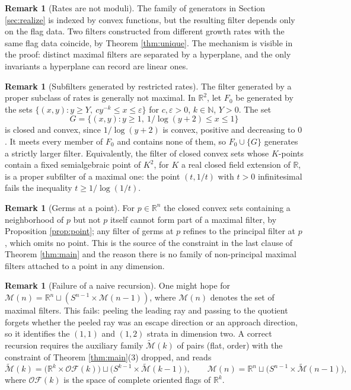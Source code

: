 \documentclass[11pt]{amsart}
\theoremstyle{plain}
\theoremstyle{definition}
\newtheorem{remark}[theorem]{Remark}
\newcommand{\RR}{\mathbb{R}}
\begin{document}
\begin{remark}[Rates are not moduli]\label{rem:rates}
The family of generators in Section \ref{sec:realize} is indexed by convex functions, but the resulting filter depends only on the flag data. Two filters constructed from different growth rates with the same flag data coincide, by Theorem \ref{thm:unique}. The mechanism is visible in the proof: distinct maximal filters are separated by a hyperplane, and the only invariants a hyperplane can record are linear ones.
\end{remark}

\begin{remark}[Subfilters generated by restricted rates]\label{rem:subfilter}
The filter generated by a proper subclass of rates is generally not maximal. In $\RR^2$, let $F_0$ be generated by the sets $\{(x,y):y\ge Y,\ cy^{-k}\le x\le\varepsilon\}$ for $c,\varepsilon>0$, $k\in\mathbb{N}$, $Y>0$. The set
\[
G=\{(x,y):y\ge1,\ 1/\log(y+2)\le x\le1\}
\]
is closed and convex, since $1/\log(y+2)$ is convex, positive and decreasing to $0$. It meets every member of $F_0$ and contains none of them, so $F_0\cup\{G\}$ generates a strictly larger filter. Equivalently, the filter of closed convex sets whose $K$-points contain a fixed semialgebraic point of $K^2$, for $K$ a real closed field extension of $\RR$, is a proper subfilter of a maximal one: the point $(t,1/t)$ with $t>0$ infinitesimal fails the inequality $t\ge1/\log(1/t)$.
\end{remark}

\begin{remark}[Germs at a point]\label{rem:germs}
For $p\in\RR^n$ the closed convex sets containing a neighborhood of $p$ but not $p$ itself cannot form part of a maximal filter, by Proposition \ref{prop:point}; any filter of germs at $p$ refines to the principal filter at $p$, which omits no point. This is the source of the constraint in the last clause of Theorem \ref{thm:main} and the reason there is no family of non-principal maximal filters attached to a point in any dimension.
\end{remark}

\begin{remark}[Failure of a naive recursion]\label{rem:recursion}
One might hope for $\mathcal{M}(n)=\RR^n\sqcup(S^{n-1}\times\mathcal{M}(n-1))$, where $\mathcal{M}(n)$ denotes the set of maximal filters. This fails: peeling the leading ray and passing to the quotient forgets whether the peeled ray was an escape direction or an approach direction, so it identifies the $(1,1)$ and $(1,2)$ strata in dimension two. A correct recursion requires the auxiliary family $\widetilde{\mathcal{M}}(k)$ of pairs (flat, order) with the constraint of Theorem \ref{thm:main}(3) dropped, and reads
\[
\widetilde{\mathcal{M}}(k)=\big(\RR^{k}\times\mathcal{OF}(k)\big)\sqcup\big(S^{k-1}\times\widetilde{\mathcal{M}}(k-1)\big),\qquad
\mathcal{M}(n)=\RR^{n}\sqcup\big(S^{n-1}\times\widetilde{\mathcal{M}}(n-1)\big),
\]
where $\mathcal{OF}(k)$ is the space of complete oriented flags of $\RR^{k}$.
\end{remark}
\end{document}
